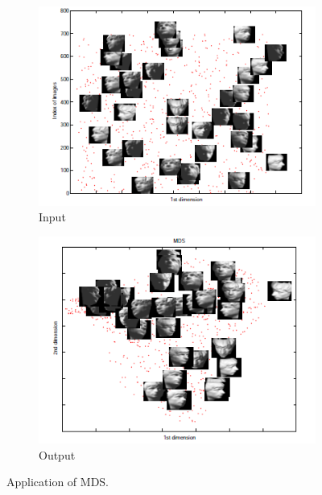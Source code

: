 \begin{figure}
\centering
\begin{subfigure}{.5\textwidth}
  \centering
  \includegraphics[width=\linewidth]{./Figures/original.png}
\caption{Input}
\end{subfigure}%
\begin{subfigure}{.5\textwidth}
  \centering
  \includegraphics[width=\linewidth]{./Figures/o_mds.png}
  \caption{Output}
\end{subfigure}
\caption{Application of MDS.}
\label{app_mds}
\end{figure}

